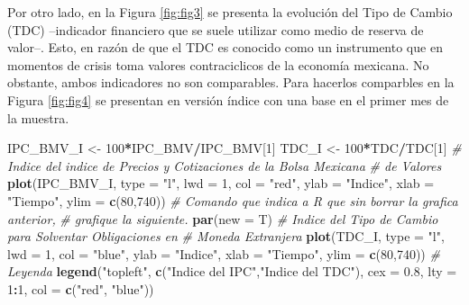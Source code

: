 \documentclass[
]{book}
\newenvironment{Shaded}{\begin{snugshade}}{\end{snugshade}}
\newcommand{\AttributeTok}[1]{\textcolor[rgb]{0.13,0.29,0.53}{#1}}
\newcommand{\CommentTok}[1]{\textcolor[rgb]{0.56,0.35,0.01}{\textit{#1}}}
\newcommand{\DecValTok}[1]{\textcolor[rgb]{0.00,0.00,0.81}{#1}}
\newcommand{\FloatTok}[1]{\textcolor[rgb]{0.00,0.00,0.81}{#1}}
\newcommand{\FunctionTok}[1]{\textcolor[rgb]{0.13,0.29,0.53}{\textbf{#1}}}
\newcommand{\NormalTok}[1]{#1}
\newcommand{\OtherTok}[1]{\textcolor[rgb]{0.56,0.35,0.01}{#1}}
\newcommand{\SpecialCharTok}[1]{\textcolor[rgb]{0.81,0.36,0.00}{\textbf{#1}}}
\newcommand{\StringTok}[1]{\textcolor[rgb]{0.31,0.60,0.02}{#1}}
\begin{document}
Por otro lado, en la Figura \ref{fig:fig3} se presenta la evolución del Tipo de Cambio (TDC) --indicador financiero que se suele utilizar como medio de reserva de valor--. Esto, en razón de que el TDC es conocido como un instrumento que en momentos de crisis toma valores contraciclicos de la economía mexicana. No obstante, ambos indicadores no son comparables. Para hacerlos comparbles en la Figura \ref{fig:fig4} se presentan en versión índice con una base en el primer mes de la muestra.

\begin{Shaded}
\begin{Highlighting}[]
\NormalTok{IPC\_BMV\_I }\OtherTok{\textless{}{-}} \DecValTok{100}\SpecialCharTok{*}\NormalTok{IPC\_BMV}\SpecialCharTok{/}\NormalTok{IPC\_BMV[}\DecValTok{1}\NormalTok{]}
\NormalTok{TDC\_I }\OtherTok{\textless{}{-}} \DecValTok{100}\SpecialCharTok{*}\NormalTok{TDC}\SpecialCharTok{/}\NormalTok{TDC[}\DecValTok{1}\NormalTok{]}
\CommentTok{\# Indice del indice de Precios y Cotizaciones de la Bolsa Mexicana }
\CommentTok{\# de Valores}
\FunctionTok{plot}\NormalTok{(IPC\_BMV\_I, }\AttributeTok{type =} \StringTok{"l"}\NormalTok{, }\AttributeTok{lwd =} \DecValTok{1}\NormalTok{, }\AttributeTok{col =} \StringTok{"red"}\NormalTok{, }\AttributeTok{ylab =} \StringTok{"Indice"}\NormalTok{, }
     \AttributeTok{xlab =} \StringTok{"Tiempo"}\NormalTok{, }\AttributeTok{ylim =} \FunctionTok{c}\NormalTok{(}\DecValTok{80}\NormalTok{,}\DecValTok{740}\NormalTok{))}
\CommentTok{\# Comando que indica a R que sin borrar la grafica anterior, }
\CommentTok{\# grafique la siguiente.}
\FunctionTok{par}\NormalTok{(}\AttributeTok{new =}\NormalTok{ T)}
\CommentTok{\# Indice del Tipo de Cambio para Solventar Obligaciones en }
\CommentTok{\# Moneda Extranjera}
\FunctionTok{plot}\NormalTok{(TDC\_I, }\AttributeTok{type =} \StringTok{"l"}\NormalTok{, }\AttributeTok{lwd =} \DecValTok{1}\NormalTok{, }\AttributeTok{col =} \StringTok{"blue"}\NormalTok{, }\AttributeTok{ylab =} \StringTok{"Indice"}\NormalTok{, }
     \AttributeTok{xlab =} \StringTok{"Tiempo"}\NormalTok{, }\AttributeTok{ylim =} \FunctionTok{c}\NormalTok{(}\DecValTok{80}\NormalTok{,}\DecValTok{740}\NormalTok{))}
\CommentTok{\# Leyenda}
\FunctionTok{legend}\NormalTok{(}\StringTok{"topleft"}\NormalTok{, }\FunctionTok{c}\NormalTok{(}\StringTok{"Indice del IPC"}\NormalTok{,}\StringTok{"Indice del TDC"}\NormalTok{), }\AttributeTok{cex =} \FloatTok{0.8}\NormalTok{, }
       \AttributeTok{lty =} \DecValTok{1}\SpecialCharTok{:}\DecValTok{1}\NormalTok{, }\AttributeTok{col =} \FunctionTok{c}\NormalTok{(}\StringTok{"red"}\NormalTok{, }\StringTok{"blue"}\NormalTok{))}
\end{Highlighting}
\end{Shaded}
\end{document}
